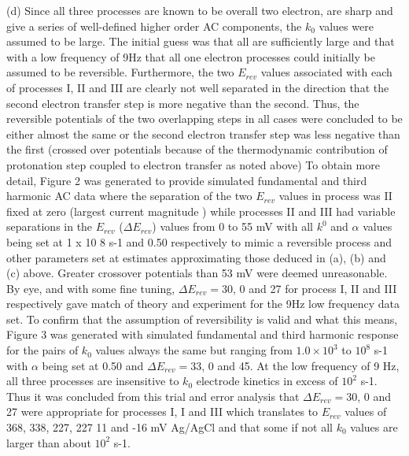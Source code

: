 \documentclass[a4paper, 12pt]{article}
\begin{document}
(d) Since all three processes are known to be overall two electron, are sharp 
and give a series of well-defined higher order AC components, the $k_0$ values were 
assumed to be large. The initial guess was that all are sufficiently large and 
that with a low frequency of 9Hz that all one electron processes could initially 
be assumed to be reversible.  Furthermore, the two $E_{rev}$ values associated with 
each of processes I, II and III are clearly not well separated in the direction 
that the second electron transfer step is more negative than the second.  Thus, 
the reversible potentials of the two  overlapping  steps in all cases were 
concluded to be either almost the same  or the second electron transfer step was 
less negative  than the first (crossed over potentials because of the 
thermodynamic contribution of protonation step coupled to electron transfer as 
noted above) To obtain more detail, Figure 2 was generated to provide simulated 
fundamental and third harmonic AC  data where the separation of the two $E_{rev}$ 
values in process was II fixed at zero (largest current magnitude ) while  
processes  II and III had variable separations in the $E_{rev}$ ($\Delta E_{rev}$) 
values from 0 to 55 mV with all $k^0$ and $\alpha$  values being set at 1 x 10 8  
s-1  and 0.50 respectively to mimic a reversible process  and other parameters 
set at estimates approximating those deduced in (a), (b) and (c) above.  Greater 
crossover potentials   than 53 mV were deemed unreasonable. By eye, and with 
some fine tuning, $\Delta E_{rev} = 30$, 0 and 27  for process I, II and III 
respectively gave match of theory and experiment for the 9Hz low frequency data 
set. To confirm that the assumption of reversibility is valid and what this 
means, Figure 3  was generated with  simulated fundamental and third harmonic 
response for the pairs of $k_0$ values always the same but ranging from $1.0 \times 
10^3$ to $10^8$  s-1  with $\alpha$ being set at 0.50 and $\Delta E_{rev} = 33$, 
0 and 45.  At the low frequency of 9 Hz, all three processes are insensitive to 
$k_0$ electrode kinetics in excess of $10^2$ s-1. Thus it was concluded from 
this trial and error analysis that $\Delta E_{rev} = 30$, 0 and 27 were 
appropriate for processes I, I and III which translates to $E_{rev}$ values of 
368, 338, 227, 227 11 and -16 mV Ag/AgCl and that some if not all $k_0$ values are 
larger than about $10^2$ s-1.   
\end{document}

